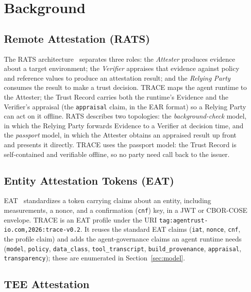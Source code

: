 \section{Background}
\label{sec:background}

\subsection{Remote Attestation (RATS)}

The RATS architecture~\citep{rats2021} separates three roles: the \emph{Attester}
produces evidence about a target environment; the \emph{Verifier} appraises that
evidence against policy and reference values to produce an attestation result; and
the \emph{Relying Party} consumes the result to make a trust decision. TRACE maps
the agent runtime to the Attester; the Trust Record carries both the runtime's
Evidence and the Verifier's appraisal (the \texttt{appraisal} claim, in the EAR
format) so a Relying Party can act on it offline. RATS describes two topologies: the
\emph{background-check} model, in which the Relying Party forwards Evidence to a
Verifier at decision time, and the \emph{passport} model, in which the Attester
obtains an appraised result up front and presents it directly. TRACE uses the
passport model: the Trust Record is self-contained and verifiable offline, so no
party need call back to the issuer.

\subsection{Entity Attestation Tokens (EAT)}

EAT~\citep{eat2023} standardizes a token carrying claims about an entity, including
measurements, a nonce, and a confirmation (\texttt{cnf}) key, in a JWT or CBOR-COSE
envelope. TRACE is an EAT profile under the URI
\texttt{tag:agentrust-io.com,2026:trace-v0.2}. It reuses the standard EAT claims
(\texttt{iat}, \texttt{nonce}, \texttt{cnf}, the profile claim) and adds the
agent-governance claims an agent runtime needs (\texttt{model}, \texttt{policy},
\texttt{data\_class}, \texttt{tool\_transcript}, \texttt{build\_provenance},
\texttt{appraisal}, \texttt{transparency}); these are enumerated in
Section~\ref{sec:model}.

\subsection{TEE Attestation}

